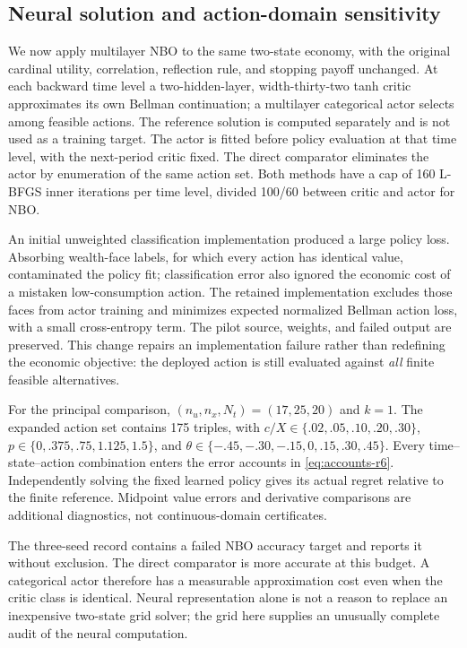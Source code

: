 \subsection{Neural solution and action-domain sensitivity}\label{sec:ndu-neural}
We now apply multilayer NBO to the same two-state economy, with the original cardinal utility, correlation, reflection rule, and stopping payoff unchanged. At each backward time level a two-hidden-layer, width-thirty-two tanh critic approximates its own Bellman continuation; a multilayer categorical actor selects among feasible actions. The reference solution is computed separately and is not used as a training target. The actor is fitted before policy evaluation at that time level, with the next-period critic fixed. The direct comparator eliminates the actor by enumeration of the same action set. Both methods have a cap of 160 L-BFGS inner iterations per time level, divided 100/60 between critic and actor for NBO.

An initial unweighted classification implementation produced a large policy loss. Absorbing wealth-face labels, for which every action has identical value, contaminated the policy fit; classification error also ignored the economic cost of a mistaken low-consumption action. The retained implementation excludes those faces from actor training and minimizes expected normalized Bellman action loss, with a small cross-entropy term. The pilot source, weights, and failed output are preserved. This change repairs an implementation failure rather than redefining the economic objective: the deployed action is still evaluated against \emph{all} finite feasible alternatives.

For the principal comparison, $(n_u,n_x,N_t)=(17,25,20)$ and $k=1$. The expanded action set contains 175 triples, with $c/X\in\{.02,.05,.10,.20,.30\}$, $p\in\{0,.375,.75,1.125,1.5\}$, and $\theta\in\{-.45,-.30,-.15,0,.15,.30,.45\}$. Every time--state--action combination enters the error accounts in \eqref{eq:accounts-r6}. Independently solving the fixed learned policy gives its actual regret relative to the finite reference. Midpoint value errors and derivative comparisons are additional diagnostics, not continuous-domain certificates.

The three-seed record contains a failed NBO accuracy target and reports it without exclusion. The direct comparator is more accurate at this budget. A categorical actor therefore has a measurable approximation cost even when the critic class is identical. Neural representation alone is not a reason to replace an inexpensive two-state grid solver; the grid here supplies an unusually complete audit of the neural computation.

